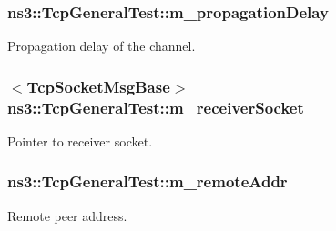 \subsubsection[{\texorpdfstring{m\+\_\+propagation\+Delay}{m_propagationDelay}}]{ ns3\+::\+Tcp\+General\+Test\+::m\+\_\+propagation\+Delay\hspace{0.3cm}{\ttfamily [private]}}\hypertarget{classns3_1_1TcpGeneralTest_ac01c7d50468e3d4ab1156b43598ef286}{}\label{classns3_1_1TcpGeneralTest_ac01c7d50468e3d4ab1156b43598ef286}


Propagation delay of the channel. 

\subsubsection[{\texorpdfstring{m\+\_\+receiver\+Socket}{m_receiverSocket}}]{$<${\bf Tcp\+Socket\+Msg\+Base}$>$ ns3\+::\+Tcp\+General\+Test\+::m\+\_\+receiver\+Socket\hspace{0.3cm}{\ttfamily [private]}}\hypertarget{classns3_1_1TcpGeneralTest_aeb0ade2e5c50f9a8d7e1ec8c6089812f}{}\label{classns3_1_1TcpGeneralTest_aeb0ade2e5c50f9a8d7e1ec8c6089812f}


Pointer to receiver socket. 

\subsubsection[{\texorpdfstring{m\+\_\+remote\+Addr}{m_remoteAddr}}]{ ns3\+::\+Tcp\+General\+Test\+::m\+\_\+remote\+Addr\hspace{0.3cm}{\ttfamily [private]}}\hypertarget{classns3_1_1TcpGeneralTest_af9ea796c36541a73091f35f7bd052694}{}\label{classns3_1_1TcpGeneralTest_af9ea796c36541a73091f35f7bd052694}


Remote peer address. 

